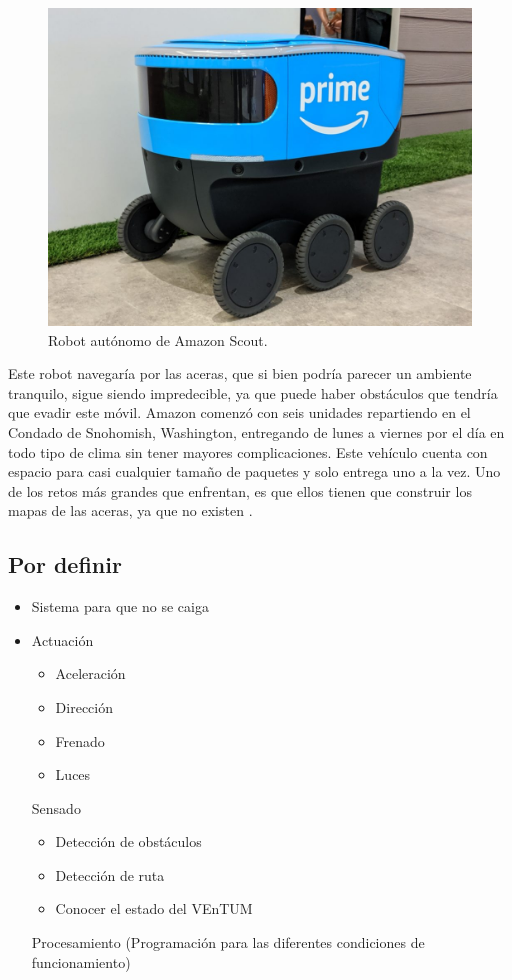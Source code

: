 	\begin{figure}[hbtp]
	\centering
	\includegraphics[scale=0.2]{Figures/Scout_Picture.jpg}
	\caption{Robot autónomo de Amazon Scout\cite{scout_picture}.} 
	\end{figure}

Este robot navegaría por las aceras, que si bien podría parecer un ambiente tranquilo, sigue siendo impredecible, ya que puede haber obstáculos que tendría que evadir este móvil. Amazon comenzó con seis unidades repartiendo en el Condado de Snohomish, Washington, entregando de lunes a viernes por el día en todo tipo de clima sin tener mayores complicaciones. Este vehículo cuenta con espacio para casi cualquier tamaño de paquetes y solo entrega uno a la vez. Uno de los retos más grandes que enfrentan, es que ellos tienen que construir los mapas de las aceras, ya que no existen \cite{scout_picture}.

\subsection{Por definir}
\begin{itemize}
\item Sistema para que no se caiga
\item Actuación

\begin{itemize}
\item Aceleración
\item Dirección
\item Frenado
\item Luces
\end{itemize}

Sensado
\begin{itemize}
\item Detección de obstáculos
\item Detección de ruta
\item Conocer el estado del VEnTUM
\end{itemize}

Procesamiento (Programación para las diferentes condiciones de funcionamiento)

\end{itemize}




